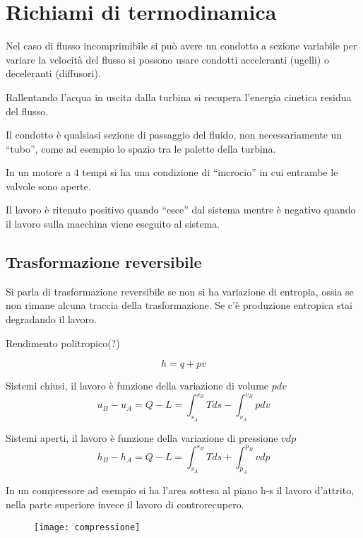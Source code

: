 
\section{Richiami di termodinamica}

Nel caso di flusso incomprimibile si può avere un condotto a sezione variabile
per variare la velocità del flusso si possono usare condotti acceleranti
(ugelli) o deceleranti (diffusori).

Rallentando l'acqua in uscita dalla turbina si recupera l'energia cinetica
residua del flusso.

Il condotto è qualsiasi sezione di passaggio del fluido, non necessariamente un
``tubo'', come ad esempio lo spazio tra le palette della turbina.

In un motore a 4 tempi si ha una condizione di ``incrocio'' in cui entrambe le
valvole sono aperte.

Il lavoro è ritenuto positivo quando ``esce'' dal sistema mentre è negativo
quando il lavoro sulla macchina viene eseguito al sistema.

\subsection{Trasformazione reversibile}
Si parla di trasformazione reversibile se non si ha variazione di entropia,
ossia se non rimane alcuna traccia della trasformazione.
Se c'è produzione entropica stai degradando il lavoro.

Rendimento politropico(?)

$$
h = q+pv
$$

Sistemi chiusi, il lavoro è funzione della variazione di volume $pdv$
\begin{equation}
u_B - u_A = Q - L = \int_{s_A}^{s_B} Tds - \int_{v_A}^{v_B}pdv
\end{equation}

Sistemi aperti, il lavoro è funzione della variazione di pressione $vdp$
\begin{equation}
h_B - h_A = Q - L =  \int_{s_A}^{s_B} Tds + \int_{p_A}^{p_B} vdp
\end{equation}

In un compressore ad esempio si ha l'area sottesa al piano h-s il lavoro
d'attrito, nella parte superiore invece il lavoro di controrecupero.

\begin{figure}[h]
\centering
\texttt{[image: compressione]}
\end{figure}

